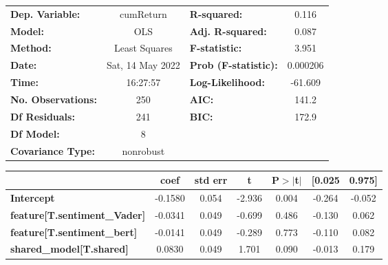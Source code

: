 \begin{center}
\begin{tabular}{lclc}
\toprule
\textbf{Dep. Variable:}                       &    cumReturn     & \textbf{  R-squared:         } &     0.116   \\
\textbf{Model:}                               &       OLS        & \textbf{  Adj. R-squared:    } &     0.087   \\
\textbf{Method:}                              &  Least Squares   & \textbf{  F-statistic:       } &     3.951   \\
\textbf{Date:}                                & Sat, 14 May 2022 & \textbf{  Prob (F-statistic):} &  0.000206   \\
\textbf{Time:}                                &     16:27:57     & \textbf{  Log-Likelihood:    } &   -61.609   \\
\textbf{No. Observations:}                    &         250      & \textbf{  AIC:               } &     141.2   \\
\textbf{Df Residuals:}                        &         241      & \textbf{  BIC:               } &     172.9   \\
\textbf{Df Model:}                            &           8      & \textbf{                     } &             \\
\textbf{Covariance Type:}                     &    nonrobust     & \textbf{                     } &             \\
\bottomrule
\end{tabular}
\begin{tabular}{lcccccc}
                                              & \textbf{coef} & \textbf{std err} & \textbf{t} & \textbf{P$> |$t$|$} & \textbf{[0.025} & \textbf{0.975]}  \\
\midrule
\textbf{Intercept}                            &      -0.1580  &        0.054     &    -2.936  &         0.004        &       -0.264    &       -0.052     \\
\textbf{feature[T.sentiment\_Vader]}          &      -0.0341  &        0.049     &    -0.699  &         0.486        &       -0.130    &        0.062     \\
\textbf{feature[T.sentiment\_bert]}           &      -0.0141  &        0.049     &    -0.289  &         0.773        &       -0.110    &        0.082     \\
\textbf{shared\_model[T.shared]}              &       0.0830  &        0.049     &     1.701  &         0.090        &       -0.013    &        0.179     \\

\end{tabular}
\end{center}
